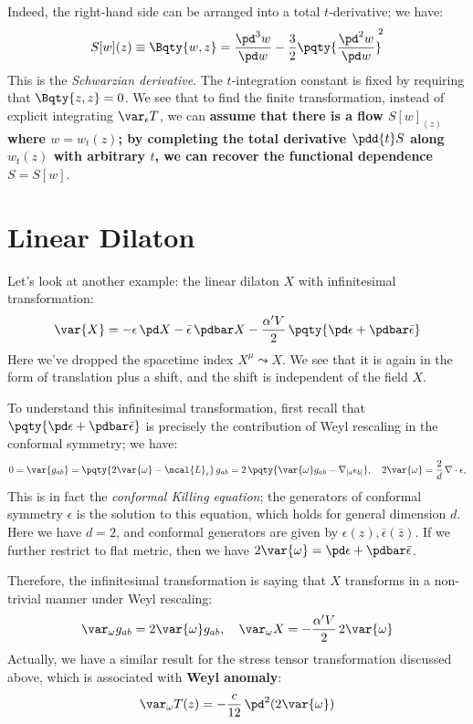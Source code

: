 \documentclass[a4paper
	,10pt
]{article}
\begin{document}
	Indeed, the right-hand side can be arranged into a total $t$-derivative; we have:
	\begin{equation}
		S[w](z)
		\equiv \Bqty{w,z}
		= \frac{\pd^3 w}{\pd w}
			- \frac{3}{2}
			\pqty{\frac{\pd^2 w}{\pd w}}^{\!\!2}
	\end{equation}
	This is the \textit{Schwarzian derivative}. The $t$-integration constant is fixed by requiring that $\Bqty{z,z} = 0$. We see that to find the finite transformation, instead of explicit integrating $\var_\epsilon T$, we can \textbf{assume that there is a flow $S[w]_{(z)}$ where $w = w_t(z)$; by completing the total derivative $\pdd{t} S$ along $w_t(z)$ with arbitrary $t$, we can recover the functional dependence $S = S[w]$}. 
	
\section{Linear Dilaton}
	Let's look at another example: the linear dilaton $X$ with infinitesimal transformation:
	\begin{equation}
		\var{X}
		= - \epsilon\,\pd X
			- \bar{\epsilon}\,\pdbar X
			- \frac{\alpha'V}{2}\,\pqty{
				\pd\epsilon
				+ \pdbar\bar{\epsilon}
			}
	\label{eq:dilaton_transformation}
	\end{equation}
	Here we've dropped the spacetime index $X^\mu \leadsto X$. We see that it is again in the form of translation plus a shift, and the shift is independent of the field $X$. 
	
	To understand this infinitesimal transformation, first recall that $
		\pqty{
			\pd\epsilon
			+ \pdbar\bar{\epsilon}
		}
	$ is precisely the contribution of Weyl rescaling in the conformal symmetry; we have:
	\begin{equation}
		0 = \var{g_{ab}}
		= \pqty{2\var{\omega} - \mcal{L}_\epsilon}\,
			g_{ab}
		= 2\,\pqty{
				\var{\omega} g_{ab}
				- \nabla_{[a} \epsilon_{b]}
			},
	\quad
		2\var{\omega}
		= \frac{2}{d}\,\nabla\cdot\epsilon,
	\label{eq:conformal_Killing}
	\end{equation}
	This is in fact the \textit{conformal Killing equation}; the generators of conformal symmetry $\epsilon$ is the solution to this equation, which holds for general dimension $d$. 
	Here we have $d = 2$, and conformal generators are given by $\epsilon(z), \bar{\epsilon}(\bar{z})$. If we further restrict to flat metric, then we have $
		2\var{\omega}
		= \pd\epsilon
			+ \pdbar\bar{\epsilon}
	$. 
	
	Therefore, the infinitesimal transformation is saying that $X$ transforms in a non-trivial manner under Weyl rescaling:
	\begin{equation}
		\var_\omega g_{ab} = 2\var{\omega} g_{ab},
	\quad
		\var_\omega X
		= - \frac{\alpha' V}{2}\, 2\var{\omega}
	\end{equation}
	Actually, we have a similar result for the stress tensor transformation discussed above, which is associated with \textbf{Weyl anomaly}:
	\begin{equation}
		\var_\omega T(z)
		= - \frac{c}{12}\,\pd^2 (2\var{\omega})
	\end{equation}
	
\end{document}
